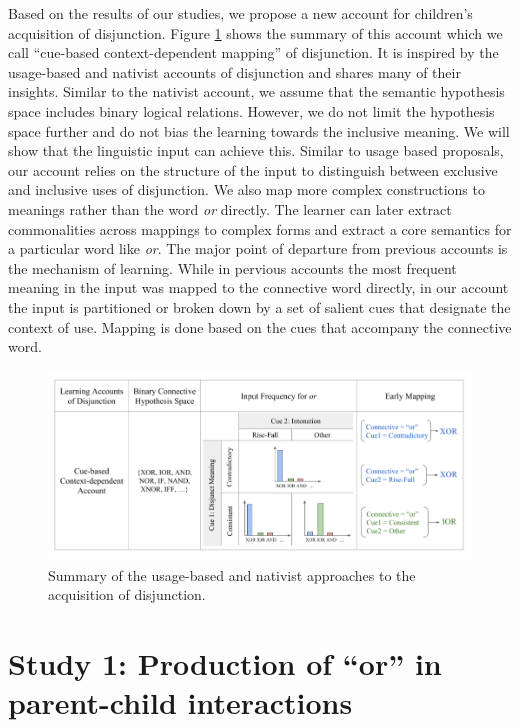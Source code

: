 \documentclass[,man,floatsintext]{apa6}
\begin{document}
Based on the results of our studies, we propose a new account for children's acquisition of disjunction. Figure \ref{fig:cueBasedAccount} shows the summary of this account which we call \enquote{cue-based context-dependent mapping} of disjunction. It is inspired by the usage-based and nativist accounts of disjunction and shares many of their insights. Similar to the nativist account, we assume that the semantic hypothesis space includes binary logical relations. However, we do not limit the hypothesis space further and do not bias the learning towards the inclusive meaning. We will show that the linguistic input can achieve this. Similar to usage based proposals, our account relies on the structure of the input to distinguish between exclusive and inclusive uses of disjunction. We also map more complex constructions to meanings rather than the word \emph{or} directly. The learner can later extract commonalities across mappings to complex forms and extract a core semantics for a particular word like \emph{or}. The major point of departure from previous accounts is the mechanism of learning. While in pervious accounts the most frequent meaning in the input was mapped to the connective word directly, in our account the input is partitioned or broken down by a set of salient cues that designate the context of use. Mapping is done based on the cues that accompany the connective word.

\begin{figure}[tb]

{\centering \includegraphics{figs/cueBasedAccount-1} 

}

\caption{Summary of the usage-based and nativist approaches to the acquisition of disjunction.}\label{fig:cueBasedAccount}
\end{figure}

\hypertarget{study-1-production-of-or-in-parent-child-interactions}{%
\section{\texorpdfstring{Study 1: Production of \enquote{or} in parent-child interactions}{Study 1: Production of ``or'' in parent-child interactions}}\label{study-1-production-of-or-in-parent-child-interactions}}
\end{document}
